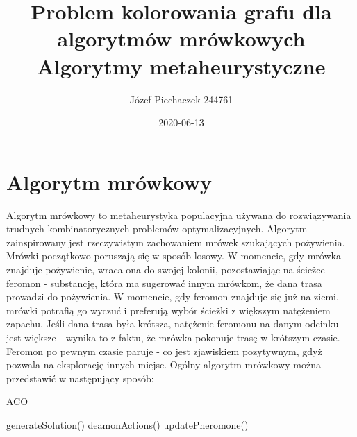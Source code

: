 \documentclass[11pt]{article}
\title{%
  Problem kolorowania grafu dla algorytmów mrówkowych \\
  \large Algorytmy metaheurystyczne 
 }
\date{2020-06-13}
\author{Józef Piechaczek 244761}
\begin{document}
\maketitle
\newpage
{}

 \section{Algorytm mrówkowy}
Algorytm mrówkowy to metaheurystyka populacyjna używana do rozwiązywania trudnych kombinatorycznych problemów optymalizacyjnych. Algorytm zainspirowany jest rzeczywistym zachowaniem mrówek szukających pożywienia. Mrówki początkowo poruszają się w sposób losowy. W momencie, gdy mrówka znajduje pożywienie, wraca ona do swojej kolonii, pozostawiając na ścieżce feromon - substancję, która ma sugerować innym mrówkom, że dana trasa prowadzi do pożywienia. W momencie, gdy feromon znajduje się już na ziemi, mrówki potrafią go wyczuć i preferują wybór ścieżki z większym natężeniem zapachu. Jeśli dana trasa była krótsza, natężenie feromonu na danym odcinku jest większe - wynika to z faktu, że mrówka pokonuje trasę w krótszym czasie. Feromon po pewnym czasie paruje - co jest zjawiskiem pozytywnym, gdyż pozwala na eksplorację innych miejsc. Ogólny algorytm mrówkowy można przedstawić w następujący sposób:
\begin{algorithm} %
\caption{ACO}
\label{alg1} %
\begin{algorithmic} %
    		\STATE generateSolution()
    		\STATE deamonActions()
    		\STATE updatePheromone()
    \ENDWHILE
\end{algorithmic}
\end{algorithm}
\end{document}
